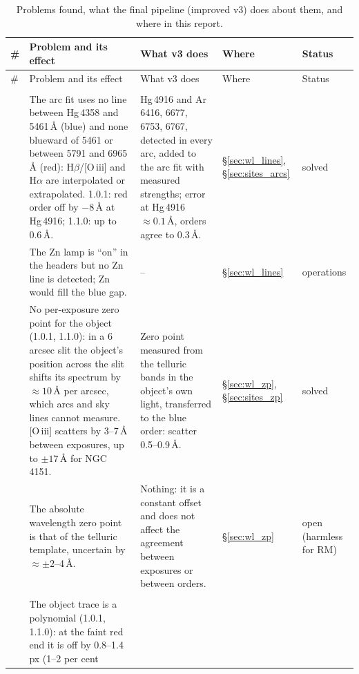 {\small
\setlength{\LTcapwidth}{\textwidth}
\begin{longtable}{@{}>{\raggedright\arraybackslash}p{0.3cm}>{\raggedright\arraybackslash}p{5.4cm}>{\raggedright\arraybackslash}p{5.3cm}>{\raggedright\arraybackslash}p{1.6cm}>{\raggedright\arraybackslash}p{1.9cm}@{}}
\caption{Problems found, what the final pipeline (improved v3) does about them, and where in this report.}
\label{tab:exec_issues}\\
\toprule
\# & Problem and its effect & What v3 does & Where & Status \\
\midrule
\endfirsthead
\toprule
\# & Problem and its effect & What v3 does & Where & Status \\
\midrule
\endhead
\bottomrule
\endfoot
\multicolumn{5}{@{}l}{\textit{Wavelength calibration}}\\
1 & The arc fit uses no line between Hg\,4358 and 5461\,\AA{} (blue) and none blueward of 5461 or between 5791 and
6965\,\AA{} (red): H$\beta$/[O\,{\sc iii}] and H$\alpha$ are interpolated or extrapolated. 1.0.1: red order off by
$-8$\,\AA{} at Hg\,4916; 1.1.0: up to 0.6\,\AA. & Hg\,4916 and Ar\,6416, 6677, 6753, 6767, detected in every arc,
added to the arc fit with measured strengths; error at Hg\,4916 $\approx0.1$\,\AA, orders agree to 0.3\,\AA. &
\S\ref{sec:wl_lines}, \S\ref{sec:sites_arcs} & solved \\
2 & The Zn lamp is ``on'' in the headers but no Zn line is detected; Zn would fill the blue gap. & -- &
\S\ref{sec:wl_lines} & operations \\
3 & No per-exposure zero point for the object (1.0.1, 1.1.0): in a 6\,arcsec slit the object's position across the
slit shifts its spectrum by $\approx10$\,\AA{} per arcsec, which arcs and sky lines cannot measure. [O\,{\sc iii}]
scatters by 3--7\,\AA{} between exposures, up to $\pm17$\,\AA{} for NGC\,4151. & Zero point measured from the telluric
bands in the object's own light, transferred to the blue order: scatter 0.5--0.9\,\AA. & \S\ref{sec:wl_zp},
\S\ref{sec:sites_zp} & solved \\
4 & The absolute wavelength zero point is that of the telluric template, uncertain by $\approx\pm2$--4\,\AA. & Nothing:
it is a constant offset and does not affect the agreement between exposures or between orders. & \S\ref{sec:wl_zp} & open (harmless for RM) \\
\midrule
\multicolumn{5}{@{}l}{\textit{Order and object traces}}\\
5 & The object trace is a polynomial (1.0.1, 1.1.0): at the faint red end it is off by 0.8--1.4\,px (1--2 per cent

\end{longtable}}
